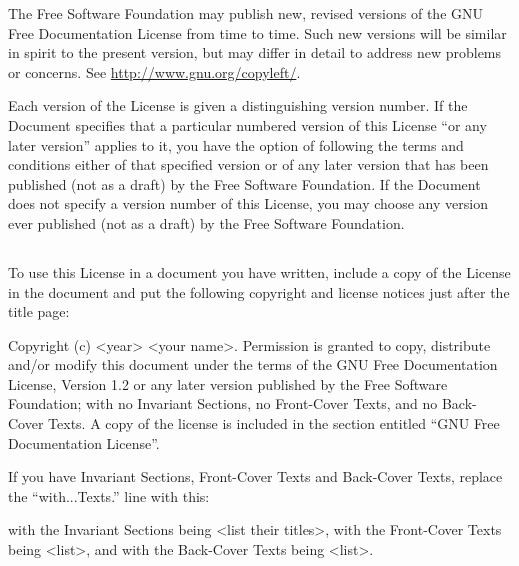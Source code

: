 {\tiny{}The Free Software Foundation may publish new, revised versions
of the GNU Free Documentation License from time to time. Such new
versions will be similar in spirit to the present version, but may
differ in detail to address new problems or concerns. See \url{http://www.gnu.org/copyleft/}.}{\tiny\par}

{\tiny{}Each version of the License is given a distinguishing version
number. If the Document specifies that a particular numbered version
of this License \textquotedblleft or any later version\textquotedblright{}
applies to it, you have the option of following the terms and conditions
either of that specified version or of any later version that has
been published (not as a draft) by the Free Software Foundation. If
the Document does not specify a version number of this License, you
may choose any version ever published (not as a draft) by the Free
Software Foundation.}{\tiny\par}

\subsection*{}

{\tiny{}To use this License in a document you have written, include
a copy of the License in the document and put the following copyright
and license notices just after the title page:}{\tiny\par}

{\tiny{}Copyright (c) <year> <your name>. Permission is granted to
copy, distribute and/or modify this document under the terms of the
GNU Free Documentation License, Version 1.2 or any later version published
by the Free Software Foundation; with no Invariant Sections, no Front-Cover
Texts, and no Back-Cover Texts. A copy of the license is included
in the section entitled \textquotedblleft GNU Free Documentation License\textquotedblright .}{\tiny\par}

{\tiny{}If you have Invariant Sections, Front-Cover Texts and Back-Cover
Texts, replace the \textquotedblleft with...Texts.\textquotedblright{}
line with this:}{\tiny\par}

{\tiny{}with the Invariant Sections being <list their titles>, with
the Front-Cover Texts being <list>, and with the Back-Cover Texts
being <list>.}{\tiny\par}


